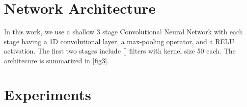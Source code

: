 \documentclass[journal]{IEEEtran}
\begin{document}
{\section{Network Architecture}
In this work, we use a shallow 3 stage Convolutional Neural Network with each stage having a 1D convolutional layer, a max-pooling operator, and a RELU activation. The first two stages include [] filters with kernel size 50 each. The architecure is summarized in \ref{fig3}.

\section{Experiments}
  
 



}
\end{document}
